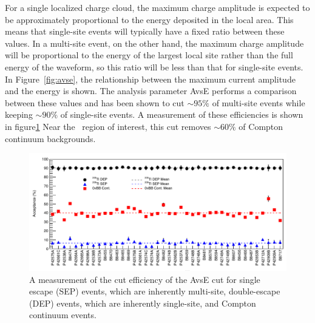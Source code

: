 \documentclass[/main.tex]{subfiles}
\begin{document}
For a single localized charge cloud, the maximum charge amplitude is expected to be approximately proportional to the energy deposited in the local area.
This means that single-site events will typically have a fixed ratio between these values.
In a multi-site event, on the other hand, the maximum charge amplitude will be proportional to the energy of the largest local site rather than the full energy of the waveform, so this ratio will be less than that for single-site events.
In Figure~\ref{fig:avse}, the relationship between the maximum current amplitude and the energy is shown.
The analysis parameter AvsE performs a comparison between these values and has been shown to cut $\sim95\%$ of multi-site events while keeping $\sim90\%$ of single-site events.
A measurement of these efficiencies is shown in figure\ref{fig:avseeff}
Near the \znbb\ region of interest, this cut removes $\sim60\%$ of Compton continuum backgrounds.
\begin{figure}
  \centering
  \includegraphics[width=\textwidth]{avseefficiency}
  \caption[Multi-site waveform cut efficiency]{\label{fig:avseeff}
    A measurement of the cut efficiency of the AvsE cut for single escape (SEP) events, which are inherently multi-site, double-escape (DEP) events, which are inherently single-site, and Compton continuum events.
  }
\end{figure}
\end{document}
